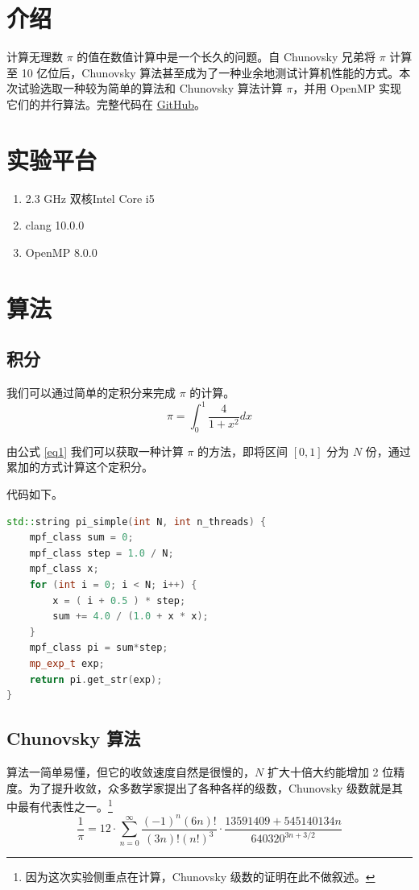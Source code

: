 \documentclass{zjureport-zh}
\begin{document}
\makecover

\section{介绍}
\par 计算无理数 $\pi$ 的值在数值计算中是一个长久的问题。自 Chunovsky 兄弟将 $\pi$ 计算至 10 亿位后，Chunovsky 算法甚至成为了一种业余地测试计算机性能的方式。本次试验选取一种较为简单的算法和 Chunovsky 算法计算 $\pi$，并用 OpenMP 实现它们的并行算法。完整代码在 \href{https://github.com/zhuo34/openmp-pi}{GitHub}。

\section{实验平台}
\begin{enumerate}[label=(\arabic*)]
	\item 2.3 GHz 双核Intel Core i5
	\item clang 10.0.0
	\item OpenMP 8.0.0
\end{enumerate}

\section{算法}
\subsection{积分}
\par 我们可以通过简单的定积分来完成 $\pi$ 的计算。
\begin{equation}
	\pi = \int_0^1 \frac{4}{1+x^2} dx \label{eq1}
\end{equation}

\par 由公式 \ref{eq1} 我们可以获取一种计算 $\pi$ 的方法，即将区间 $[0, 1]$ 分为 $N$ 份，通过累加的方式计算这个定积分。
\par 代码如下。
\begin{lstlisting}[language=c++]
std::string pi_simple(int N, int n_threads) {
	mpf_class sum = 0;
	mpf_class step = 1.0 / N;
	mpf_class x;
	for (int i = 0; i < N; i++) {
		x = ( i + 0.5 ) * step;
		sum += 4.0 / (1.0 + x * x);
	}
	mpf_class pi = sum*step;
	mp_exp_t exp;
	return pi.get_str(exp);
}
\end{lstlisting}


\subsection{Chunovsky 算法}
\par 算法一简单易懂，但它的收敛速度自然是很慢的，$N$ 扩大十倍大约能增加 2 位精度。为了提升收敛，众多数学家提出了各种各样的级数，Chunovsky 级数就是其中最有代表性之一。\footnote{因为这次实验侧重点在计算，Chunovsky 级数的证明在此不做叙述。}
\begin{equation}
	\frac{1}{\pi} = 12\cdot\sum\limits_{n=0}^{\infty} \frac{(-1)^n(6n)!}{(3n)!(n!)^3} \cdot \frac{13591409+545140134n}{640320^{3n+3/2}} \label{eq2}
\end{equation}
\end{document}
